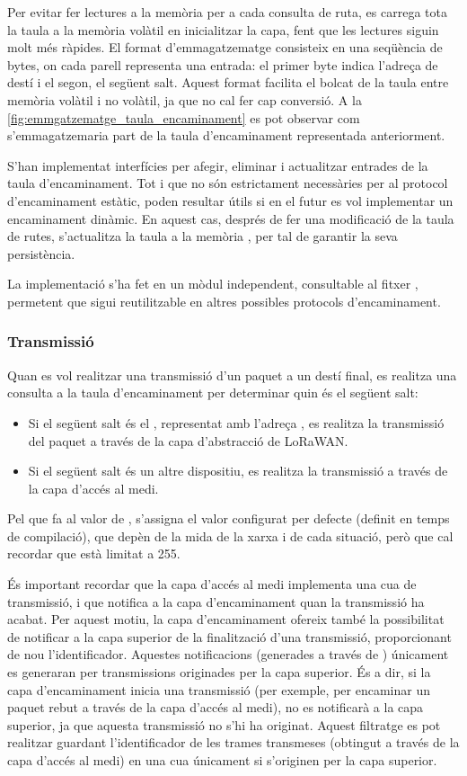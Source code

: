 \documentclass{tfgitic}[2024/07/01]
\begin{document}
{Per evitar fer lectures a la memòria  per a cada consulta de ruta, es carrega tota la taula a la memòria volàtil en inicialitzar la capa, fent que les lectures siguin molt més ràpides. El format d'emmagatzematge consisteix en una seqüència de bytes, on cada parell representa una entrada: el primer byte indica l'adreça de destí i el segon, el següent salt. Aquest format facilita el bolcat de la taula entre memòria volàtil i no volàtil, ja que no cal fer cap conversió. A la \autoref{fig:emmgatzematge_taula_encaminament} es pot observar com s'emmagatzemaria part de la taula d'encaminament representada anteriorment. 

S'han implementat interfícies per afegir, eliminar i actualitzar entrades de la taula d'encaminament. Tot i que no són estrictament necessàries per al protocol d'encaminament estàtic, poden resultar útils si en el futur es vol implementar un encaminament dinàmic. En aquest cas, després de fer una modificació de la taula de rutes, s'actualitza la taula a la memòria , per tal de garantir la seva persistència.

La implementació s'ha fet en un mòdul independent, consultable al fitxer , permetent que sigui reutilitzable en altres possibles protocols d'encaminament.
\subsubsection{Transmissió}
\label{subsubsec:routing_tx}
Quan es vol realitzar una transmissió d'un paquet a un destí final, es realitza una consulta a la taula d'encaminament per determinar quin és el següent salt:
\begin{itemize}
    \item Si el següent salt és el , representat amb l'adreça , es realitza la transmissió del paquet a través de la capa d'abstracció de LoRaWAN.
    \item Si el següent salt és un altre dispositiu, es realitza la transmissió a través de la capa d'accés al medi.
\end{itemize}

Pel que fa al valor de , s'assigna el valor configurat per defecte (definit en temps de compilació), que depèn de la mida de la xarxa i de cada situació, però que cal recordar que està limitat a 255.

És important recordar que la capa d'accés al medi implementa una cua de transmissió, i que notifica a la capa d'encaminament quan la transmissió ha acabat. Per aquest motiu, la capa d'encaminament ofereix també la possibilitat de notificar a la capa superior de la finalització d'una transmissió, proporcionant de nou l'identificador. Aquestes notificacions (generades a través de ) únicament es generaran per transmissions originades per la capa superior. És a dir, si la capa d'encaminament inicia una transmissió (per exemple, per encaminar un paquet rebut a través de la capa d'accés al medi), no es notificarà a la capa superior, ja que aquesta transmissió no s'hi ha originat. Aquest filtratge es pot realitzar guardant l'identificador de les trames transmeses (obtingut a través de la capa d'accés al medi) en una cua únicament si s'originen per la capa superior.

}
\end{document}

